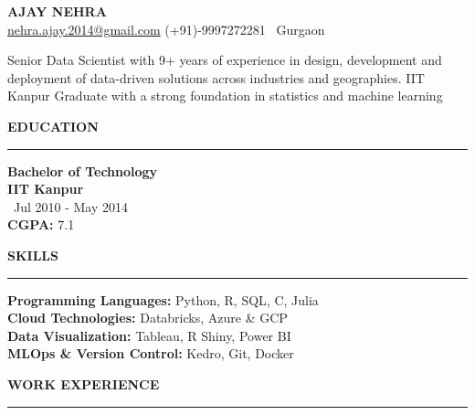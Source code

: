 \documentclass[a4paper,10pt]{article}
\begin{document}
\begin{center}
    \textbf{\LARGE \MakeUppercase{Ajay Nehra}} \\
    \vspace{1mm}
    \href{mailto:nehra.ajay.2014@gmail.com}{nehra.ajay.2014@gmail.com} \hspace{5mm} (+91)-9997272281 \hspace{5mm} \faMapMarker \,  Gurgaon
\end{center}

\vspace{1mm}

Senior Data Scientist with 9+ years of experience in design, development and deployment of data-driven solutions across industries and geographies. IIT Kanpur Graduate with a strong foundation in statistics and machine learning

\vspace{1mm}

\begin{multicols}{2}

\textbf{\LARGE \MakeUppercase{Education}} \\
\rule{\columnwidth}{0.8pt}
\textbf{Bachelor of Technology} \\
\textbf{IIT Kanpur} \\
\faCalendar \, Jul 2010 - May 2014 \\
\textbf{CGPA:} 7.1

\columnbreak

\textbf{\LARGE \MakeUppercase{Skills}} \\
\rule{\columnwidth}{0.8pt}
\textbf{Programming Languages:} Python, R, SQL, C, Julia\\
\textbf{Cloud Technologies:} Databricks, Azure \& GCP\\
\textbf{Data Visualization:} Tableau, R Shiny, Power BI \\
\textbf{MLOps \& Version Control:} Kedro, Git, Docker

\end{multicols}

\vspace{1mm}

\textbf{\LARGE \MakeUppercase{Work Experience}} \\
\rule{\textwidth}{0.8pt}
\end{document}
